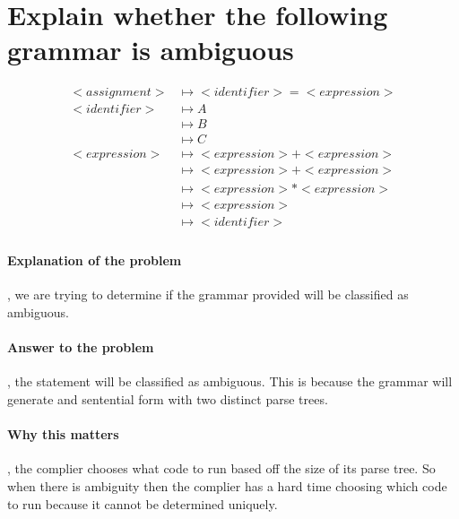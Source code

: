 \section{Explain whether the following grammar is ambiguous}
 \begin{align*}
<assignment> &\mapsto <identifier> = <expression>\\
	<identifier> &\mapsto A \\
	 &\mapsto B \\
	 &\mapsto C \\
<expression> &\mapsto <expression> + <expression> \\
	 &\mapsto <expression> + <expression> \\
	 &\mapsto <expression> * <expression> \\
	 &\mapsto <expression> \\
	 &\mapsto <identifier> \\
\end{align*}
\paragraph{Explanation of the problem}, we are trying to determine if the grammar provided will be classified as ambiguous. 
\paragraph{Answer to the problem}
, the statement will be classified as ambiguous. 
This is because the grammar will generate and sentential form with two distinct parse trees. 
\paragraph{Why this matters}
, the complier chooses what code to run based off the size of its parse tree. So when there is ambiguity then the complier has a hard time choosing which code to run because it cannot be determined uniquely. 
